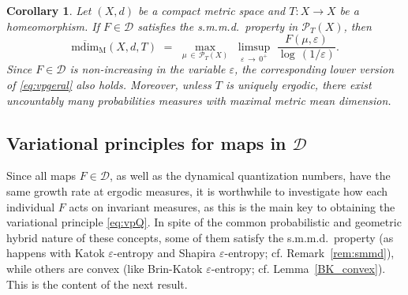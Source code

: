 \documentclass[11pt,a4paper,reqno]{amsart}
\theoremstyle{plain}
\newtheorem{corollary}[theorem]{Corollary}
\theoremstyle{definition}
\newcommand{\vep}{\varepsilon}
\newcommand{\cP}{{\mathcal P}}
\newcommand{\cD}{{\mathcal D}}
\newcommand{\cE}{{\mathcal E}}
\begin{document}
\begin{corollary}\label{teo:VP}
Let $(X,d)$ be a compact metric space and $T\colon X\to X$ be a homeomorphism. If $F \in\cD$ satisfies the s.m.m.d.~property in $\cP_T(X)$, then
\begin{equation}\label{eq:vpgeral}
\mathrm{\overline{mdim}_M}(X,d,T)
 \,\, =\,\, \max_{\mu\,\in\,\cP_T(X)}\,\,  \limsup_{\vep \, \to \, 0^+} \, \,\frac{F(\mu, \vep)}{\log \,(1/\vep)}. 
\end{equation}
Since $F \in \mathcal{D}$ is non-increasing in the variable $\vep$, the corresponding lower version of \eqref{eq:vpgeral} also holds. Moreover, unless $T$ is uniquely ergodic, there exist uncountably many probabilities measures with maximal metric mean dimension.
\end{corollary}






\subsection{Variational principles for maps in $\cD$}
Since all maps $F\in\cD$, as well as the dynamical quantization numbers, have the same growth rate at ergodic measures, it is worthwhile to investigate how each individual $F$ acts on invariant measures, as this is the main key to obtaining the variational principle \eqref{eq:vpQ}. In spite of the common probabilistic and geometric hybrid nature of these concepts, some of them satisfy the s.m.m.d.~property (as happens with Katok $\vep$-entropy and Shapira $\vep$-entropy; cf. Remark~\ref{rem:smmd}), while others are convex (like Brin-Katok $\vep$-entropy; cf. Lemma~\ref{BK_convex}). This is the content of the next result.
\end{document}
